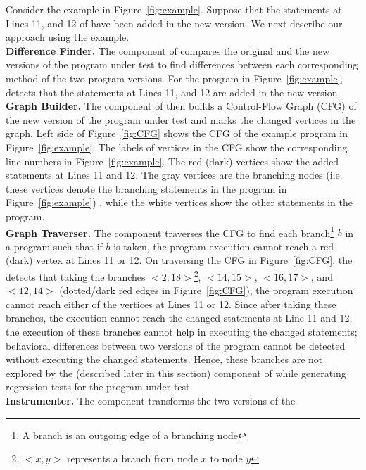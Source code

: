 Consider the example in Figure~\ref{fig:example}. Suppose that the statements at Lines 11, and 12 of  have been added in the new version. 	We next describe our approach using the example.
\\ \textbf{Difference Finder.} The  component of  compares the original and the new versions of the program under test to find differences between each corresponding method of the two program versions. For the program in Figure~\ref{fig:example},  detects that the statements at Lines 11, and 12 are added in the new version. 
\\ \textbf{Graph Builder. }The  component of  then builds a Control-Flow Graph (CFG) of the new version of  the program under test and marks the changed vertices in the graph. Left side of Figure~\ref{fig:CFG} shows the CFG of the example program in Figure~\ref{fig:example}. The labels of vertices in the CFG show the corresponding line numbers in Figure~\ref{fig:example}. The red (dark) vertices show the added statements at Lines 11 and 12. The gray vertices are the branching nodes (i.e. these vertices denote the branching statements in the program in Figure~\ref{fig:example}) , while the white vertices show the other statements in the program.
\\ \textbf{Graph Traverser.} The  component traverses the CFG to find each branch\footnote{A branch is an outgoing edge of a branching node} $b$ in a program such that if $b$ is taken, the program execution cannot reach a red (dark) vertex at Lines 11 or 12.  On traversing the CFG in Figure~\ref{fig:CFG}, the  detects that taking the branches $<2, 18>$\footnote{$<x,y>$ represents a branch from node $x$ to node $y$}, $<14, 15>$, $<16, 17>$, and $<12, 14>$ (dotted/dark red edges in Figure~\ref{fig:CFG}), the program execution cannot reach either of the vertices at Lines 11 or 12. Since after taking these branches, the execution cannot reach the changed statements at Line 11 and 12, the execution of these branches cannot help in executing the changed statements; behavioral differences between two versions of the program cannot be detected without executing the changed statements. Hence, these branches are not explored by the  (described later in this section) component of  while generating regression tests for the program under test. 
\\ \textbf{Instrumenter. }The  component transforms the two versions of the
